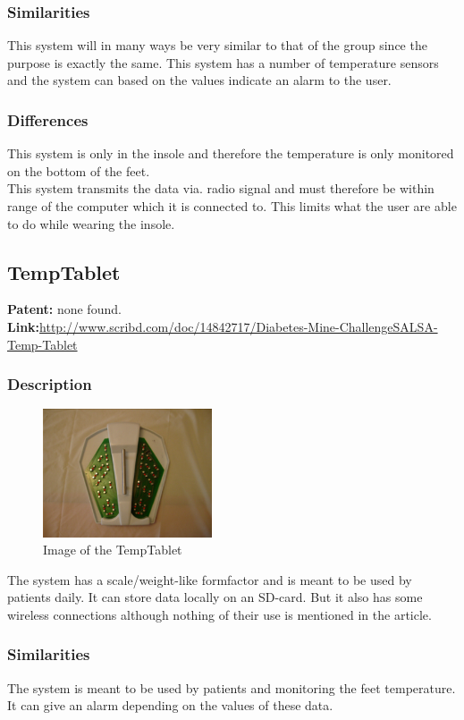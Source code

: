 \subsubsection{Similarities}
This system will in many ways be very similar to that of the group since the purpose is exactly the same. This system has a number of temperature sensors and the system can based on the values indicate an alarm to the user.
\subsubsection{Differences}
This system is only in the insole and therefore the temperature is only monitored on the bottom of the feet.\\
This system transmits the data via. radio signal and must therefore be within range of the computer which it is connected to. This limits what the user are able to do while wearing the insole.

\subsection{TempTablet}
\textbf{Patent:} none found.\\
\textbf{Link:}\url{http://www.scribd.com/doc/14842717/Diabetes-Mine-ChallengeSALSA-Temp-Tablet}
\subsubsection{Description}
\begin{figure}
\includegraphics[width=5cm]{billeder/temptablet}
\caption{Image of the TempTablet}
\end{figure}
The system has a scale/weight-like formfactor and is meant to be used by patients daily. It can store data locally on an SD-card. But it also has some wireless connections although nothing of their use is mentioned in the article.
\subsubsection{Similarities}
The system is meant to be used by patients and monitoring the feet temperature. It can give an alarm depending on the values of these data.
